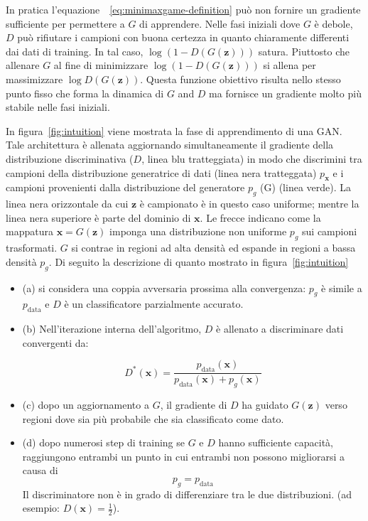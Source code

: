 In pratica l'equazione~~\ref{eq:minimaxgame-definition} può non fornire un gradiente sufficiente per permettere a $G$ di apprendere. Nelle fasi iniziali dove $G$ è debole, $D$ può rifiutare i campioni con buona certezza in quanto chiaramente differenti dai dati di training. In tal caso, $\log ( 1- D(G(\bm{z})))$ satura. Piuttosto che allenare $G$ al fine di minimizzare $\log (1 - D(G(\bm{z})))$ si allena per massimizzare $\log D(G(\bm{z}))$. 
Questa funzione obiettivo risulta nello stesso punto fisso che forma la dinamica di $G$ and $D$ ma fornisce un gradiente molto più stabile nelle fasi iniziali.

In figura~\ref{fig:intuition} viene mostrata la fase di apprendimento di una GAN. Tale architettura è allenata aggiornando simultaneamente il gradiente della distribuzione discriminativa ($D$, linea blu tratteggiata) in modo che discrimini tra campioni della distribuzione generatrice di dati (linea nera tratteggata) $p_{\bm{x}}$ e i campioni provenienti dalla distribuzione del generatore $p_g$ (G) (linea verde).
La linea nera orizzontale da cui $\bm{z}$ è campionato è in questo caso uniforme; mentre la linea nera superiore è parte del dominio di $\bm{x}$. Le frecce indicano come la mappatura $\bm{x}=G(\bm{z})$ imponga una distribuzione non uniforme $p_g$ sui campioni trasformati. $G$ si contrae in regioni ad alta densità ed espande in regioni a bassa densità $p_g$. 
Di seguito la descrizione di quanto mostrato in figura~\ref{fig:intuition}
\begin{itemize}
\item (a) si considera una coppia avversaria prossima alla convergenza: $p_g$ è simile a $p_\text{data}$ e
$D$ è un classificatore parzialmente accurato.

\item (b) Nell'iterazione interna dell'algoritmo, $D$ è allenato a discriminare dati convergenti da:

\[D^*(\bm{x}) = 
\frac{
    p_\text{data}(\bm{x})
    }{
        p_\text{data}(\bm{x}) + p_g(\bm{x})}
\]

\item (c) dopo un aggiornamento a $G$, il gradiente di $D$ ha guidato $G(\bm{z})$ verso regioni dove sia più probabile che sia classificato come dato.

\item (d) dopo numerosi step di training se $G$ e $D$ hanno sufficiente capacità, raggiungono entrambi un punto in cui entrambi non possono migliorarsi a causa di \[p_g = p_\text{data}\] Il discriminatore non è in grado di differenziare tra le due distribuzioni. (ad esempio: $D(\bm{x}) = \frac{1}{2}$).
\end{itemize}

